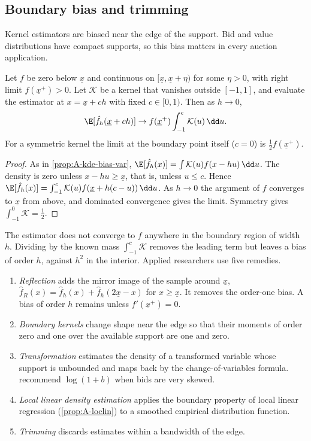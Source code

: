 \subsection{Boundary bias and trimming}\label{sec:A-kde-boundary}

Kernel estimators are biased near the edge of the support. Bid and value distributions have compact
supports, so this bias matters in every auction application.

\begin{proposition}\label{prop:A-kde-boundary}
Let $f$ be zero below $\underline x$ and continuous on $[\underline x,\underline x+\eta)$ for some
$\eta>0$, with right limit $f(\underline x^+)>0$. Let $\mathcal{K}$ be a kernel that vanishes outside
$[-1,1]$, and evaluate the estimator at $x=\underline x+ch$ with fixed $c\in[0,1)$. Then as $h\to0$,
\begin{equation*}
\E[\hat f_h(\underline x+ch)]\to f(\underline x^+)\int_{-1}^{c}\mathcal{K}(u)\,\dd u .
\end{equation*}
For a symmetric kernel the limit at the boundary point itself ($c=0$) is $\frac{1}{2}f(\underline x^+)$.
\end{proposition}

\begin{proof}
As in \cref{prop:A-kde-bias-var}, $\E[\hat f_h(x)]=\int\mathcal{K}(u)f(x-hu)\,\dd u$. The density is zero
unless $x-hu\ge\underline x$, that is, unless $u\le c$. Hence
$\E[\hat f_h(x)]=\int_{-1}^{c}\mathcal{K}(u)f(\underline x+h(c-u))\,\dd u$. As $h\to0$ the argument of $f$
converges to $\underline x$ from above, and dominated convergence gives the limit. Symmetry gives
$\int_{-1}^{0}\mathcal{K}=\frac{1}{2}$.
\end{proof}

The estimator does not converge to $f$ anywhere in the boundary region of width $h$. Dividing by the
known mass $\int_{-1}^{c}\mathcal{K}$ removes the leading term but leaves a bias of order $h$, against
$h^2$ in the interior. Applied researchers use five remedies.
\begin{enumerate}[label=(\alph*)]
\item \emph{Reflection} adds the mirror image of the sample around $\underline x$,
$\hat f_R(x)=\hat f_h(x)+\hat f_h(2\underline x-x)$ for $x\ge\underline x$. It removes the order-one
bias. A bias of order $h$ remains unless $f'(\underline x^+)=0$.
\item \emph{Boundary kernels} change shape near the edge so that their moments of order zero and one
over the available support are one and zero.
\item \emph{Transformation} estimates the density of a transformed variable whose support is
unbounded and maps back by the change-of-variables formula. \citet[footnote~13]{LiPerrigneVuong2002}
recommend $\log(1+b)$ when bids are very skewed.
\item \emph{Local linear density estimation} applies the boundary property of local linear regression
(\cref{prop:A-loclin}) to a smoothed empirical distribution function.
\item \emph{Trimming} discards estimates within a bandwidth of the edge.
\end{enumerate}

